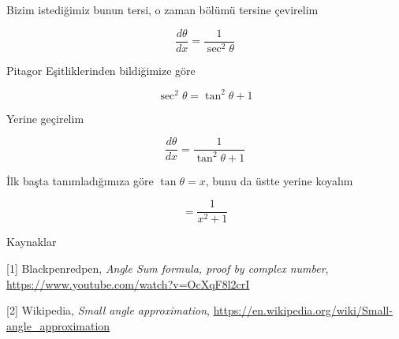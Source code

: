 \documentclass[12pt,fleqn]{article}\usepackage{../../common}
\begin{document}
Bizim istediğimiz bunun tersi, o zaman bölümü tersine çevirelim

$$ \frac{d\theta}{dx} = \frac{1}{\sec^{2}\theta} $$

Pitagor Eşitliklerinden bildiğimize göre

$$ \sec^{2}\theta = \tan^{2}\theta + 1 $$

Yerine geçirelim

$$ \frac{d\theta}{dx} = \frac{1}{\tan^{2}\theta + 1} $$

İlk başta tanımladığımıza göre $\tan\theta = x$, bunu da üstte yerine
koyalım

$$  = \frac{1}{x^2 + 1} $$

Kaynaklar 

[1] Blackpenredpen, {\em Angle Sum formula, proof by complex number},
     \url{https://www.youtube.com/watch?v=OcXqF8l2crI}
     
[2] Wikipedia, {\em Small angle approximation},
    \url{https://en.wikipedia.org/wiki/Small-angle_approximation}
\end{document}

